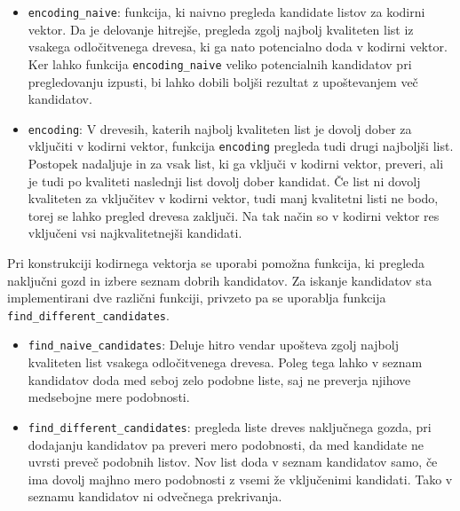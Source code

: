 \documentclass[12pt,a4paper,twoside]{article}
\theoremstyle{definition} %
\theoremstyle{plain} %
\numberwithin{equation}{section}  %
\begin{document}
\begin{itemize}
	\item \texttt{encoding\_\-naive}: funkcija, ki naivno pregleda kandidate listov za kodirni vektor. 
	Da je delovanje hitrejše, pregleda zgolj najbolj kvaliteten list iz vsakega odločitvenega drevesa, ki ga nato potencialno doda v kodirni vektor.
	Ker lahko funkcija \texttt{encoding\_\-naive} veliko potencialnih kandidatov pri pregledovanju izpusti, bi lahko dobili boljši rezultat z upoštevanjem več kandidatov.

	\item \texttt{encoding}:
	V drevesih, katerih najbolj kvaliteten list je dovolj dober za vključiti v kodirni vektor, funkcija \texttt{encoding} pregleda tudi drugi najboljši list.
	Postopek nadaljuje in za vsak list, ki ga vključi v kodirni vektor, preveri, ali je tudi po kvaliteti naslednji list dovolj dober kandidat.
	Če list ni dovolj kvaliteten za vključitev v kodirni vektor, tudi manj kvalitetni listi ne bodo, torej se lahko pregled drevesa zaključi.
	Na tak način so v kodirni vektor res vključeni vsi najkvalitetnejši kandidati.
\end{itemize}

Pri konstrukciji kodirnega vektorja se uporabi pomožna funkcija, ki pregleda naključni gozd in izbere seznam dobrih kandidatov.
Za iskanje kandidatov sta implementirani dve različni funkciji, privzeto pa se uporablja funkcija \texttt{find\_\-different\_\-candidates}.

\begin{itemize}
	\item \texttt{find\_\-naive\_\-candidates}:
	Deluje hitro vendar upošteva zgolj najbolj kvaliteten list vsakega odločitvenega drevesa.
	Poleg tega lahko v seznam kandidatov doda med seboj zelo podobne liste, saj ne preverja njihove medsebojne mere podobnosti.

	\item \texttt{find\_\-different\_\-candidates}: pregleda liste dreves naključnega gozda, 
	pri dodajanju kandidatov pa preveri mero podobnosti, da med kandidate ne uvrsti preveč podobnih listov.
	Nov list doda v seznam kandidatov samo, če ima dovolj majhno mero podobnosti z vsemi že vključenimi kandidati.
	Tako v seznamu kandidatov ni odvečnega prekrivanja.
\end{itemize}

\end{document}

